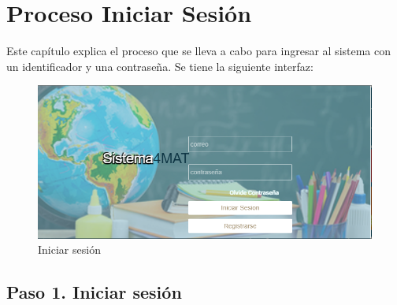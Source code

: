 \chapter{Proceso Iniciar Sesión}
	Este capítulo explica el proceso que se lleva a cabo para ingresar al 
	sistema con un identificador y una contraseña. 
	Se tiene la siguiente interfaz:
	
	\begin{figure}[hbtp]
		\centering
		\includegraphics[scale=0.3]{images/Interfaz/IUGS00_login.png}
		\caption{Iniciar sesión}
	\end{figure}


\section{Paso 1. Iniciar sesión}
	
	